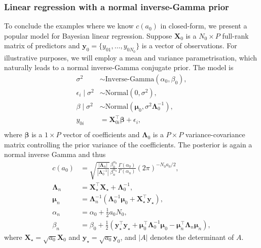 \documentclass[a4paper, notitlepage, 11pt]{article}
\begin{document}
\subsubsection{Linear regression with a normal inverse-Gamma prior}
\label{sec:linreg_ex}
To conclude the examples where we know $c(a_0)$ in closed-form, we present a popular model for Bayesian linear regression.
Suppose $\boldsymbol X_0$ is a $N_0 \times P$ full-rank matrix of predictors and $\boldsymbol y_0 = \{y_{01}, \ldots, y_{0N_0} \}$ is a vector of observations.
For illustrative purposes, we will employ a mean and variance parametrisation, which naturally leads to a normal inverse-Gamma conjugate prior.
The model is 
\begin{align*}
 \sigma^2 &\sim \text{Inverse-Gamma}(\alpha_0, \beta_0),\\
 \epsilon_i \mid \sigma^2  &\sim \text{Normal}(0, \sigma^2), \\
 \beta \mid \sigma^2 &\sim \text{Normal}(\boldsymbol \mu_0, \sigma^2\boldsymbol\Lambda_0^{-1}),\\
 y_{0i} &= \boldsymbol X_{0i}^\top \boldsymbol\beta + \epsilon_i, \\
\end{align*} 
where $\boldsymbol\beta$ is a $ 1 \times P$ vector of coefficients and $\boldsymbol\Lambda_0$ is a $P \times P$ variance-covariance matrix controlling the prior variance of the coefficients.
The posterior is again a normal inverse Gamma and thus
\begin{align}
 \label{eq:cA0_regression}
c(a_0) &= \sqrt{\frac{|\boldsymbol\Lambda_n|}{|\boldsymbol\Lambda_0^{-1}|}} \frac{\beta_0^{\alpha_0}}{\beta_n^{\alpha_n}}\frac{\Gamma(\alpha_0)}{\Gamma(\alpha_n)}  (2\pi)^{-N_0 a_0/2},\\
\nonumber
\boldsymbol\Lambda_n &= \boldsymbol X_{\star}^\top\boldsymbol X_{\star} + \boldsymbol \Lambda_0^{-1}, \\
\nonumber
\boldsymbol\mu_n &= \boldsymbol\Lambda_n^{-1}\left(\boldsymbol\Lambda_0^{-1}\boldsymbol\mu_0 + \boldsymbol X_{\star}^\top\boldsymbol y_{\star} \right),  \\
\nonumber
\alpha_n &= \alpha_0 + \frac{1}{2}a_0N_0,\\
\nonumber
\beta_n &= \beta_0 + \frac{1}{2}\left( \boldsymbol y_{\star}^\top \boldsymbol y_{\star} + \boldsymbol \mu_0^\top \boldsymbol \Lambda_0^{-1} \boldsymbol \mu_0 - \boldsymbol\mu_n^\top \boldsymbol \Lambda_n \boldsymbol \mu_n  \right),
\end{align}
where $\boldsymbol X_{\star} = \sqrt{a_0} \boldsymbol X_0$ and $\boldsymbol y_{\star} = \sqrt{a_0} \boldsymbol y_0$, and $|A|$ denotes the determinant of $A$.
\end{document}
